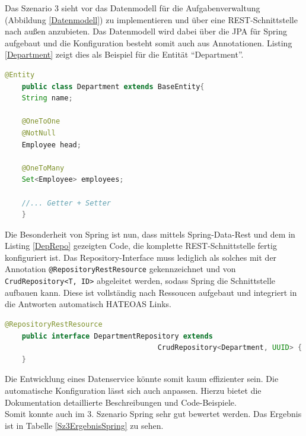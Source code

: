 Das Szenario 3 sieht vor das Datenmodell für die Aufgabenverwaltung (Abbildung \ref{Datenmodell}) zu implementieren und über eine \ac{REST}-Schnittstelle nach außen anzubieten. Das Datenmodell wird dabei über die \ac{JPA} für Spring aufgebaut und die Konfiguration besteht somit auch aus Annotationen. Listing \ref{Department} zeigt dies als Beispiel für die Entität \enquote{Department}.

\begin{minipage}{\linewidth}
	\begin{lstlisting}[caption={Umsetzung der Entität \enquote{Department} mittels JPA},label=Department,language=JAVA] 
	@Entity
	public class Department extends BaseEntity{
	String name;
	
	@OneToOne
	@NotNull
	Employee head;
	
	@OneToMany
	Set<Employee> employees;
	
	//... Getter + Setter 
	}
	\end{lstlisting}
\end{minipage}

Die Besonderheit von Spring ist nun, dass mittels Spring-Data-Rest und dem in Listing \ref{DepRepo} gezeigten Code, die komplette \ac{REST}-Schnittstelle fertig konfiguriert ist. Das Repository-Interface muss lediglich als solches mit der Annotation \lstinline|@RepositoryRestResource| gekennzeichnet und von \lstinline|CrudRepository<T, ID>| abgeleitet werden, sodass Spring die Schnittstelle aufbauen kann. Diese ist vollständig nach Ressoucen aufgebaut und integriert in die Antworten automatisch \ac{HATEOAS} Links.

\begin{minipage}{\linewidth}
	\begin{lstlisting}[caption={Erstellung der REST-Schnittstelle für das \enquote{Department} über ein Interface},label=DepRepo,language=JAVA] 
	@RepositoryRestResource
	public interface DepartmentRepository extends 
									CrudRepository<Department, UUID> { 
	}
	\end{lstlisting}
\end{minipage}

Die Entwicklung eines Datenservice könnte somit kaum effizienter sein. Die automatische Konfiguration lässt sich auch anpassen. Hierzu bietet die Dokumentation detaillierte Beschreibungen und Code-Beispiele.\\
Somit konnte auch im 3. Szenario Spring sehr gut bewertet werden. Das Ergebnis ist in Tabelle \ref{Sz3ErgebnisSpring} zu sehen.

